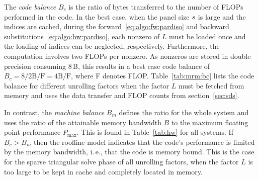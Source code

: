 The \textit{code balance} $B_c$ is the ratio of bytes transferred to the
number of FLOPs performed in the code.
In the best case, when the panel size $s$ is large and the indices are
cached, during the forward~\eqref{eq:algo:fw:pardiso} and backward
substitutions~\eqref{eq:algo:bw:pardiso}, each nonzero of $L$ must be loaded once
and the loading of indices can be neglected,
respectively. 
Furthermore, the computation involves two FLOPs per nonzero.
As nonzeros are stored in double precision consuming $8$\,B, this results in a
best case code balance of $B_c = 8 / 2 \text{B/F} = 4 \text{B/F}$, where F
denotes FLOP.
Table~\ref{tab:mrm:bc} lists the code balance for different unrolling factors
when the factor $L$ must be fetched from memory and uses the data transfer and
FLOP counts from section~\ref{sec:sds}.

In contrast, the \textit{machine balance} $B_m$ defines the ratio for the whole system
and uses the ratio of the attainable memory bandwidth $B$ to the maximum floating point
performance $P_\text{max}$.
This is found in Table~\ref{tab:hw} for all systems.
%
If $B_c > B_m$ then the roofline model indicates 
that the code's performance is
limited by the memory bandwidth,
i.\,e., that the code is memory bound.
{This is the case for the sparse %
triangular solve 
phase %
of all
unrolling factors,
when the factor $L$ is too large to be kept in cache and
completely located in memory.}

